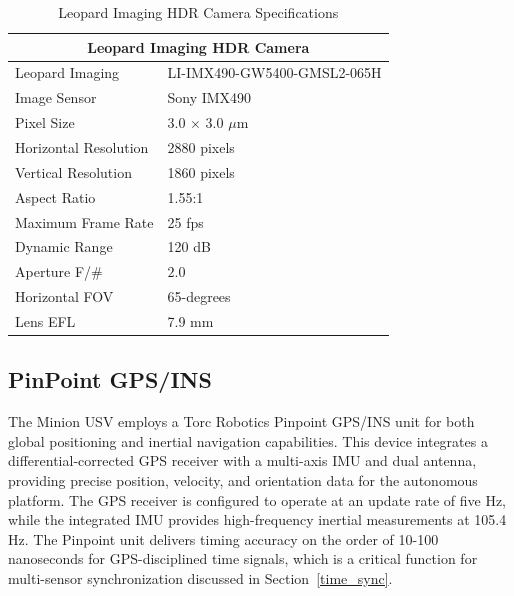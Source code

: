 \documentclass{erauthesis}
\begin{document}
\begin{table}[htpb]
\centering
\begin{tabular}{ll}
\hline
\multicolumn{2}{c}{Leopard Imaging HDR Camera}\\
\hline
\hline
Leopard Imaging & LI-IMX490-GW5400-GMSL2-065H \\
Image Sensor & Sony IMX490 \\
Pixel Size & 3.0 $\times$ 3.0 $\mu$m \\
Horizontal Resolution & 2880 pixels \\
Vertical Resolution & 1860 pixels \\
Aspect Ratio & 1.55:1 \\
Maximum Frame Rate & 25 fps \\
Dynamic Range & 120 dB \\
Aperture F/\# & $2.0$ \\
Horizontal \Ac{FOV} & 65-degrees \\ %
Lens \Ac{EFL} & 7.9 mm\\
\hline
\end{tabular}
\caption{Leopard Imaging HDR Camera Specifications}
\label{table:hdr_camera_specs}
\end{table}


\subsection{PinPoint GPS/INS} \label{sensors_GPS}
% 


The Minion \ac{USV} employs a Torc Robotics Pinpoint \ac{GPS}/\ac{INS} unit for both global positioning and inertial navigation capabilities.
This device integrates a differential-corrected \ac{GPS} receiver with a multi-axis \ac{IMU} and dual antenna, providing precise position, velocity, and orientation data for the autonomous platform.
The \ac{GPS} receiver is configured to operate at an update rate of five Hz, while the integrated \ac{IMU} provides high-frequency inertial measurements at 105.4 Hz.
The Pinpoint unit delivers timing accuracy on the order of 10-100 nanoseconds for \ac{GPS}-disciplined time signals, which is a critical function for multi-sensor synchronization discussed in Section~\ref{time_sync}.
\end{document}
